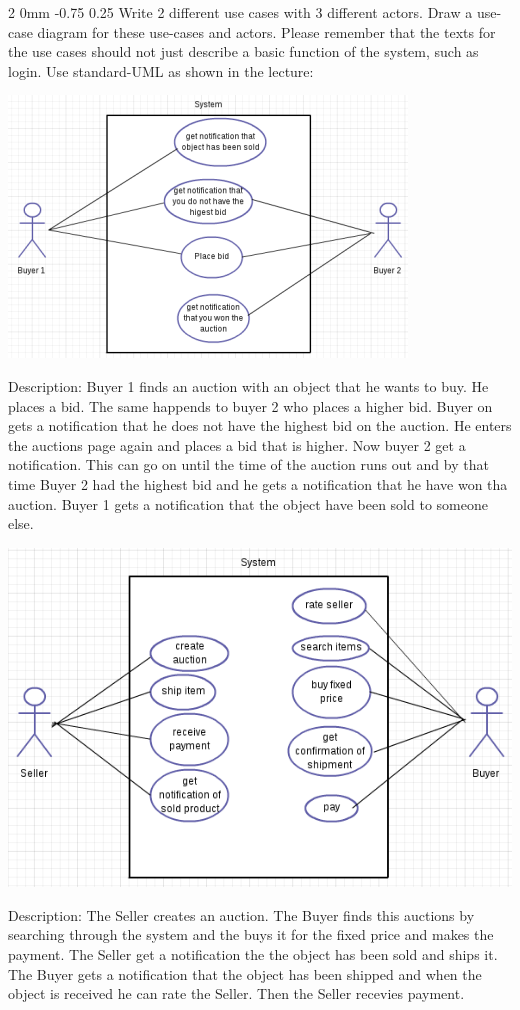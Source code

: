 \documentclass[a4paper,11pt]{article}
\makeatletter
\renewcommand{\subsection}{\@startsection
   {subsection}%
   {2}%
   {0mm}%
   {-0.75\baselineskip}%
   {0.25\baselineskip}%
   {\rmfamily\normalfont\slshape\normalsize}}%
\makeatother
\begin{document}
\subsection{Write 2 different use cases with 3 different actors. Draw a use-case diagram for these use-cases and actors. Please remember that the texts for the use cases should not just describe a basic function of the system, such as login. Use standard-UML as shown in the lecture:}
\centerline{\includegraphics[scale=0.8]{usecase1}}
Description: \newline
Buyer 1 finds an auction with an object that he wants to buy. He places a bid. The same happends to buyer 2 who places a higher bid. Buyer on gets a notification that he does not have the highest bid on the auction. He enters the auctions page again and places a bid that is higher. Now buyer 2 get a notification. This can go on until the time of the auction runs out and by that time Buyer 2 had the highest bid and he gets a notification that he have won tha auction. Buyer 1 gets a notification that the object have been sold to someone else.\newline
\centerline{\includegraphics[scale=0.6]{usecase2}}
Description: \newline
The Seller creates an auction. The Buyer finds this auctions by searching through the system and the buys it for the fixed price and makes the payment. The Seller get a notification the the object has been sold and ships it. The Buyer gets a notification that the object has been shipped and when the object is received he can rate the Seller. Then the Seller recevies payment.
\end{document}
